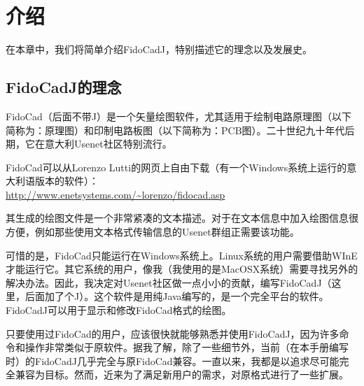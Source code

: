 \documentclass[10pt,a4paper,twoside]{scrreprt}
\begin{document}
\clearpage{}
\def\contentsname{目录}%
\tableofcontents {}

\clearpage{}
\def\listfigurename{插图}%
\listoffigures



\clearpage{}
\def\listtablename{表格}%
\listoftables


\chapter{介绍}


在本章中，我们将简单介绍FidoCadJ，特别描述它的理念以及发展史。

\section{FidoCadJ的理念}

FidoCad（后面不带J）是一个矢量绘图软件，尤其适用于绘制电路原理图（以下简称为：原理图）和印制电路板图（以下简称为：PCB图）。二十世纪九十年代后期，它在意大利Usenet社区特别流行。

FidoCad可以从Lorenzo Lutti的网页上自由下载（有一个Windows系统上运行的意大利语版本的软件）：\\ \href{http://www.enetsystems.com/~lorenzo/fidocad.asp}{http://www.enetsystems.com/\textasciitilde lorenzo/fidocad.asp}

其生成的绘图文件是一个非常紧凑的文本描述。对于在文本信息中加入绘图信息很方便，例如那些使用文本格式传输信息的Usenet群组正需要该功能。

可惜的是，FidoCad只能运行在Windows系统上。Linux系统的用户需要借助WInE才能运行它。其它系统的用户，像我（我使用的是MacOSX系统）需要寻找另外的解决办法。因此，我决定对Usenet社区做一点小小的贡献，编写FidoCadJ（这里，后面加了个J）。这个软件是用纯Java编写的，是一个完全平台的软件。FidoCadJ可以用于显示和修改FidoCad格式的绘图。

只要使用过FidoCad的用户，应该很快就能够熟悉并使用FidoCadJ，因为许多命令和操作非常类似于原软件。据我了解，除了一些细节外，当前（在本手册编写时）的FidoCadJ几乎完全与原FidoCad兼容。一直以来，我都是以追求尽可能完全兼容为目标。然而，近来为了满足新用户的需求，对原格式进行了一些扩展。
\end{document}
